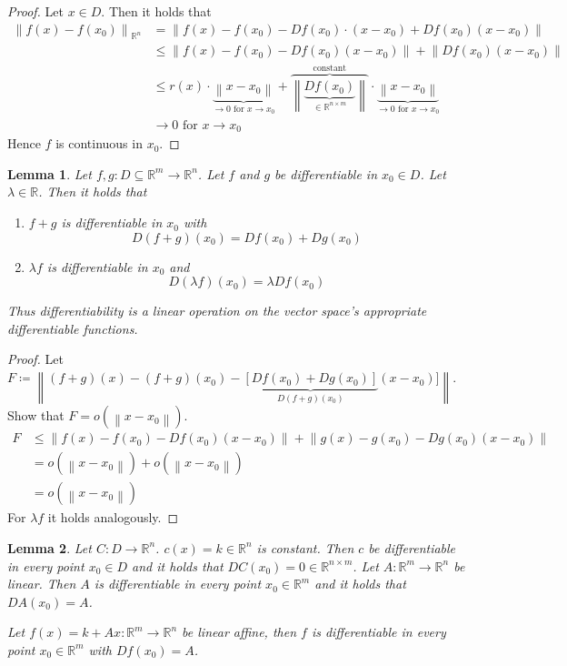 \documentclass{article}
\newtheorem{lemma}{Lemma}  \numberwithin{lemma}{section}
\newcommand{\norm}[1]{\left\|#1\right\|}
\begin{document}
\begin{proof}
  Let $x \in D$. Then it holds that
  \begin{align*}
    \norm{f(x) - f(x_0)}_{\mathbb R^n}
      &= \norm{f(x) - f(x_0) - Df(x_0) \cdot (x - x_0) + Df(x_0) (x - x_0)} \\
      &\leq \norm{f(x) - f(x_0) - Df(x_0) (x - x_0)} + \norm{Df(x_0) (x - x_0)} \\
      &\leq r(x) \cdot \underbrace{\norm{x - x_0}}_{\to 0 \text{ for } x \to x_0} + \overbrace{\norm{\underbrace{Df(x_0)}_{\in \mathbb R^{n\times m}}}}^{\text{constant}} \cdot \underbrace{\norm{x - x_0}}_{\to 0 \text{ for } x \to x_0} \\
      &\to 0 \text{ for } x \to x_0
  \end{align*}
  Hence $f$ is continuous in $x_0$.
\end{proof}

\begin{lemma} %
  \label{lem5}
  Let $f,g: D \subseteq \mathbb R^m \to \mathbb R^n$. Let $f$ and $g$ be differentiable in $x_0 \in D$.
  Let $\lambda \in \mathbb R$. Then it holds that
  \begin{enumerate}
    \item $f + g$ is differentiable in $x_0$ with
      \[ D(f + g)(x_0) = Df(x_0) + Dg(x_0) \]
    \item $\lambda f$ is differentiable in $x_0$ and
      \[ D(\lambda f)(x_0) = \lambda Df(x_0) \]
  \end{enumerate}
  Thus differentiability is a linear operation on the vector space's appropriate differentiable functions.
\end{lemma}

\begin{proof}
  Let $F \coloneqq \norm{(f + g)(x) - (f + g)(x_0) - \underbrace{[Df(x_0) + Dg(x_0)]}_{D(f + g)(x_0)}(x - x_0)]}$.
  Show that $F = o(\norm{x - x_0})$.
  \begin{align*}
    F &\leq \norm{f(x) - f(x_0) - Df(x_0)(x - x_0)} + \norm{g(x) - g(x_0) - Dg(x_0)(x - x_0)} \\
      &= o(\norm{x - x_0}) + o(\norm{x - x_0}) \\
      &= o(\norm{x - x_0})
  \end{align*}
  For $\lambda f$ it holds analogously.
\end{proof}

\begin{lemma} %
  Let $C: D \to \mathbb R^n$. $c(x) = k \in \mathbb R^n$ is constant.
  Then $c$ be differentiable in every point $x_0 \in D$ and it holds that $D C(x_0) = 0 \in \mathbb R^{n\times m}$.
  Let $A: \mathbb R^m \to \mathbb R^n$ be linear. Then $A$ is differentiable in every point $x_0 \in \mathbb R^m$ and it holds that $DA(x_0) = A$.

  Let $f(x) = k + Ax: \mathbb R^m \to \mathbb R^n$ be linear affine, then $f$ is differentiable in every point $x_0 \in \mathbb R^m$ with $Df(x_0) = A$.
\end{lemma}
\end{document}
